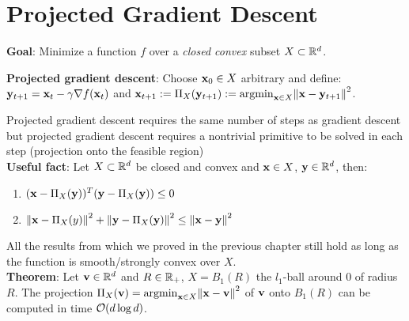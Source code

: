 \section{Projected Gradient Descent}
\textbf{Goal}: Minimize a function $f$ over a \textit{closed convex} subset $X \subset \mathbb{R}^d$.
\begin{framed}
    \textbf{Projected gradient descent}: Choose $\mathbf{x}_0 \in X$ arbitrary and define: $\mathbf{y}_{t+1}= \mathbf{x}_t - \gamma \nabla f(\mathbf{x}_t)$ and $\mathbf{x}_{t+1} := \Pi_X(\mathbf{y}_{t+1}) := \mathrm{argmin}_{\mathbf{x} \in X}{\norm{\mathbf{x} - \mathbf{y}_{t+1}}^2}$.
\end{framed}
Projected gradient descent requires the same number of steps as gradient descent but projected gradient descent requires a nontrivial primitive to be solved in each step (projection onto the feasible region) \\
\textbf{Useful fact}: Let $X \subset \mathbb{R}^d$ be closed and convex and $\mathbf{x} \in X$, $\mathbf{y} \in \mathbb{R}^d$, then:
\begin{enumerate}[label=(\roman*), topsep=0pt,itemsep=0ex,partopsep=0ex,parsep=0ex]  
    \itemsep0em
    \item $(\mathbf{x} - \Pi_X(\mathbf{y}))^T(\mathbf{y} - \Pi_X(\mathbf{y}))\leq 0$
    \item $\norm{\mathbf{x} - \Pi_X(y)}^2 + \norm{\mathbf{y} - \Pi_X(\mathbf{y})}^2 \leq \norm{\mathbf{x} - \mathbf{y}}^2$
\end{enumerate}
All the results from which we proved in the previous chapter still hold as long as the function is smooth/strongly convex over $X$. \\
\textbf{Theorem}: Let $\mathbf{v} \in \mathbb{R}^d$ and $R \in \mathbb{R}_{+}$, $X = B_1(R)$ the $l_1$-ball around 0 of radius $R$. The projection $\Pi_X(\mathbf{v}) = \mathrm{argmin}_{\mathbf{x} \in X}{\norm{\mathbf{x} - \mathbf{v}}^2}$ of $\mathbf{v}$ onto $B_1(R)$ can be computed in time $\mathcal{O}(d \log d)$.